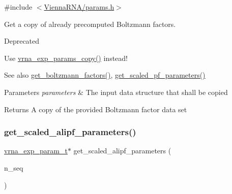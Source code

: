 {\ttfamily \#include $<$\mbox{\hyperlink{params_8h}{Vienna\+R\+N\+A/params.\+h}}$>$}



Get a copy of already precomputed Boltzmann factors. 

\begin{DoxyRefDesc}{Deprecated}
\item[\mbox{\hyperlink{deprecated__deprecated000096}{Deprecated}}]Use \mbox{\hyperlink{group__energy__parameters_ga70bc46be7cfa5434a71efe241c4f0609}{vrna\+\_\+exp\+\_\+params\+\_\+copy()}} instead!\end{DoxyRefDesc}


\begin{DoxySeeAlso}{See also}
\mbox{\hyperlink{group__energy__parameters_gaef2b931c7e9d4ffb0a5c33df50ec2068}{get\+\_\+boltzmann\+\_\+factors()}}, \mbox{\hyperlink{group__energy__parameters_gabf3b9271c41dd3fac02d56e0b02b3344}{get\+\_\+scaled\+\_\+pf\+\_\+parameters()}}
\end{DoxySeeAlso}

\begin{DoxyParams}{Parameters}
{\em parameters} & The input data structure that shall be copied \\
\hline
\end{DoxyParams}
\begin{DoxyReturn}{Returns}
A copy of the provided Boltzmann factor data set 
\end{DoxyReturn}
\mbox{\label{group__energy__parameters_ga0ccf4e1be085a573533fd6b9da2d8cf9}} 
\subsubsection{\texorpdfstring{get\+\_\+scaled\+\_\+alipf\+\_\+parameters()}{get\_scaled\_alipf\_parameters()}}
{\footnotesize\ttfamily \mbox{\hyperlink{group__energy__parameters_ga01d8b92fe734df8d79a6169482c7d8d8}{vrna\+\_\+exp\+\_\+param\+\_\+t}}$\ast$ get\+\_\+scaled\+\_\+alipf\+\_\+parameters (\begin{DoxyParamCaption}\item[{unsigned int}]{n\+\_\+seq }\end{DoxyParamCaption})}



